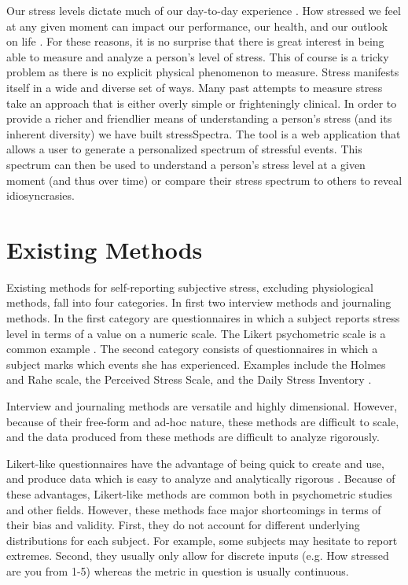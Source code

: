 \documentclass{sigchi}
\begin{document}
Our stress levels dictate much of our day-to-day experience \cite{kanner1981comparison} \cite{levy1997relationship}. How stressed we feel at any given moment can impact our performance, our health, and our outlook on life \cite{delongis1988impact} \cite{bolger1989effects}. For these reasons, it is no surprise that there is great interest in being able to measure and analyze a person's level of stress. This of course is a tricky problem as there is no explicit physical phenomenon to measure. Stress manifests itself in a wide and diverse set of ways. Many past attempts to measure stress take an approach that is either overly simple or frighteningly clinical. In order to provide a richer and friendlier means of understanding a person's stress (and its inherent diversity) we have built stressSpectra. The tool is a web application that allows a user to generate a personalized spectrum of stressful events. This spectrum can then be used to understand a person's stress level at a given moment (and thus over time) or compare their stress spectrum to others to reveal idiosyncrasies. 


\section{Existing Methods}
Existing methods for self-reporting subjective stress, excluding physiological methods, fall into four categories. In first two interview methods and journaling methods. In the first category are questionnaires in which a subject reports stress level in terms of a value on a numeric scale. The Likert psychometric scale is a common example \cite{maurer1998comparison}. The second category consists of questionnaires in which a subject marks which events she has experienced. Examples include the Holmes and Rahe scale, the Perceived Stress Scale, and the Daily Stress Inventory \cite{CSHSquestionnaires} \cite{holmes1967social} \cite{brantley1988convergence}. 

Interview and journaling methods are versatile and highly dimensional. However, because of their free-form and ad-hoc nature, these methods are difficult to scale, and the data produced from these methods are difficult to analyze rigorously.

Likert-like questionnaires have the advantage of being quick to create and use, and produce data which is easy to analyze and analytically rigorous \cite{bland1997statistics}. Because of these advantages, Likert-like methods are common both in psychometric studies and other fields. However, these methods face major shortcomings in terms of their bias and validity. First, they do not account for different underlying distributions for each subject. For example, some subjects may hesitate to report extremes. Second, they usually only allow for discrete inputs (e.g. How stressed are you from 1-5) whereas the metric in question is usually continuous.
\end{document}
